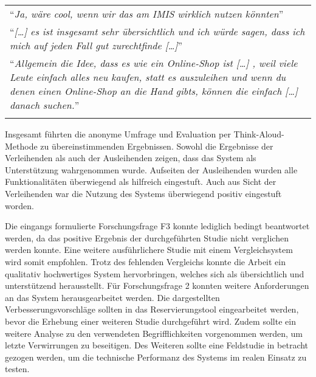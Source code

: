 \begin{longtable}{p{}} \arrayrulecolor{maincolor}\hline
  \enquote{\textit{Ja, wäre cool, wenn wir das am IMIS wirklich nutzen
  könnten}}                                                      \\
  \enquote{\textit{[\dots] es ist insgesamt sehr übersichtlich und ich würde
  sagen, dass ich mich auf jeden Fall gut zurechtfinde [\dots]}} \\
  \enquote{\textit{Allgemein die Idee, dass es wie ein Online-Shop ist [\dots] ,
      weil viele Leute einfach alles neu kaufen, statt es auszuleihen und wenn du
      denen einen Online-Shop an die Hand gibts, können die einfach [\dots] danach
  suchen.}}                                                      \\
  \arrayrulecolor{maincolor}\hline
\end{longtable}

Insgesamt führten die anonyme Umfrage und Evaluation per Think-Aloud-Methode zu übereinstimmenden
Ergebnissen. Sowohl die Ergebnisse der Verleihenden als auch der Ausleihenden zeigen, dass das
System als Unterstützung wahrgenommen wurde. Aufseiten der Ausleihenden wurden alle Funktionalitäten
überwiegend als hilfreich eingestuft. Auch aus Sicht der Verleihenden war die Nutzung des Systems
überwiegend positiv eingestuft worden.

Die eingangs formulierte Forschungsfrage F3 konnte lediglich bedingt beantwortet werden, da das
positive Ergebnis der durchgeführten Studie nicht verglichen werden konnte. Eine weitere
ausführlichere Studie mit einem Vergleichsystem wird somit empfohlen. Trotz des fehlenden Vergleichs
konnte die Arbeit ein qualitativ hochwertiges System hervorbringen, welches sich als übersichtlich
und unterstützend herausstellt. Für Forschungsfrage 2 konnten weitere Anforderungen an das System
herausgearbeitet werden. Die dargestellten Verbesserungsvorschläge sollten in das Reservierungstool
eingearbeitet werden, bevor die Erhebung einer weiteren Studie durchgeführt wird. Zudem sollte ein
weitere Analyse zu den verwendeten Begrifflichkeiten vorgenommen werden, um letzte Verwirrungen zu
beseitigen. Des Weiteren sollte eine Feldstudie in betracht gezogen werden, um die technische
Performanz des Systems im realen Einsatz zu testen.